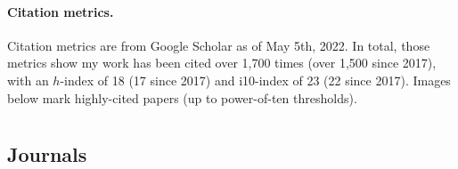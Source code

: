 \documentclass[10pt]{article}
\begin{document}
\paragraph{Citation metrics.}
Citation metrics are from Google Scholar as of May 5th, 2022.
In total, those metrics show my work has been cited over 1,700 times (over 1,500 since 2017),
with an $h$-index of 18 (17 since 2017) and i10-index of 23 (22 since 2017).
Images below mark highly-cited papers (up to power-of-ten thresholds).



\section{}

\nocite{*}

\subsection{Journals}
\end{document}
